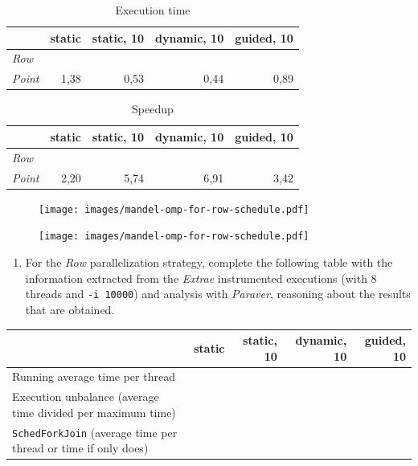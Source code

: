 \documentclass[a4paper]{article}
\begin{document}
\begin{table}[H]
	\centering
	\begin{tabular}{l|rrrr}
		& \textbf{static} & \textbf{static, 10} & \textbf{dynamic, 10} & \textbf{guided, 10} \\
		\hline
		\textit{Row} & & & & \\
		\textit{Point} & 1,38 & 0,53 & 0,44 & 0,89
	\end{tabular}
	\caption{Execution time}
\end{table}
\begin{table}[H]
	\centering
	\begin{tabular}{l|rrrr}
		& \textbf{static} & \textbf{static, 10} & \textbf{dynamic, 10} & \textbf{guided, 10} \\
		\hline
		\textit{Row} & & & & \\
		\textit{Point} & 2,20 & 5,74 & 6,91 & 3,42
	\end{tabular}
	\caption{Speedup}
\end{table}
\begin{figure}[H]
	\centering
	\begin{minipage}[t]{0.49\textwidth}
		\texttt{[image: images/mandel-omp-for-row-schedule.pdf]}
	\end{minipage}
	\begin{minipage}[t]{0.49\textwidth}
		\texttt{[image: images/mandel-omp-for-row-schedule.pdf]}
	\end{minipage}
\end{figure}

\begin{enumerate}[resume]
	\item For the \textit{Row} parallelization strategy, complete the following table with the information extracted from the \textit{Extrae} instrumented executions (with 8 threads and \texttt{-i 10000}) and analysis with \textit{Paraver}, reasoning about the results that are obtained.
\end{enumerate}

\begin{table}[H]
	\centering
	\tablinesep=0.5cm
	\begin{tabular}{p{5cm}|rrrr}
		& \textbf{static} & \textbf{static, 10} & \textbf{dynamic, 10} & \textbf{guided, 10} \\
		\hline
		Running average time per thread & & & & \\
		Execution unbalance (average time divided per maximum time) & & & & \\
		\texttt{SchedForkJoin} (average time per thread or time if only does)
	\end{tabular}
\end{table}
\end{document}
